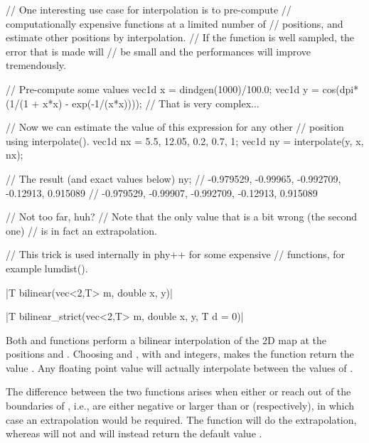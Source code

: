 \begin{example}
\begin{cppcode}
// One interesting use case for interpolation is to pre-compute
// computationally expensive functions at a limited number of
// positions, and estimate other positions by interpolation.
// If the function is well sampled, the error that is made will
// be small and the performances will improve tremendously.

// Pre-compute some values
vec1d x = dindgen(1000)/100.0;
vec1d y = cos(dpi*(1/(1 + x*x) - exp(-1/(x*x))));
// That is very complex...

// Now we can estimate the value of this expression for any other
// position using interpolate().
vec1d nx = {5.5, 12.05, 0.2, 0.7, 1};
vec1d ny = interpolate(y, x, nx);

// The result (and exact values below)
ny; // {-0.979529, -0.99965, -0.992709, -0.12913, 0.915089}
    // {-0.979529, -0.99907, -0.992709, -0.12913, 0.915089}

// Not too far, huh?
// Note that the only value that is a bit wrong (the second one)
// is in fact an extrapolation.

// This trick is used internally in phy++ for some expensive
// functions, for example lumdist().
\end{cppcode}
\end{example}

\funcitem \cppinline|T bilinear(vec<2,T> m, double x, y)| 

\cppinline|T bilinear_strict(vec<2,T> m, double x, y, T d = 0)| 

Both  and  functions perform a bilinear interpolation of the 2D map  at the positions  and . Choosing  and , with  and  integers, makes the function return the value . Any floating point value will actually interpolate between the values of .

The difference between the two functions arises when either  or  reach out of the boundaries of , i.e., are either negative or larger than  or  (respectively), in which case an extrapolation would be required. The  function will do the extrapolation, whereas  will not and will instead return the default value .

